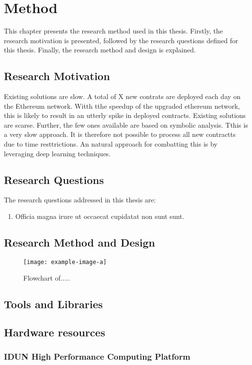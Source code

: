 \chapter{Method}
\label{chap:method}
This chapter presents the research method used in this thesis. Firstly, the research motivation is presented, followed by the research questions defined for this thesis. Finally, the research method and design is explained.

\section{Research Motivation}

Existing solutions are slow.
A total of X new contrats are deployed  each day on the Ethereum network. Witth tthe speedup of the upgraded ethereum network,  this is likely to result in an utterly spike  in deployed contracts. Existing solutions are scarse. Further, the few ones available are based on symbolic analysis.  Tthis is a very slow approach. It is therefore not possible to process all new contractts due to time resttrictions. An natural approach for combatting this is by leveraging deep learning techniques.





\section{Research Questions}
\label{sec:research-questions}
The research questions addressed in this thesis are:
\begin{enumerate}[label=RQ\arabic*., leftmargin=1.5cm]
    \item Officia magna irure ut occaecat cupidatat non sunt sunt.
\end{enumerate}

\section{Research Method and Design}
\label{sec:research-method-and-design}

\begin{figure}[htp]
    \centering
    \texttt{[image: example-image-a]}
    \caption{Flowchart of.....}
    \label{fig:flowchart}
\end{figure}

\section{Tools and Libraries}
\label{sec:tools-and-libraries}

\section{Hardware resources}
\label{sec:hardware-resources}

\subsection{IDUN High Performance Computing Platform}
\label{sec:idun-high-performance-computing-platform}